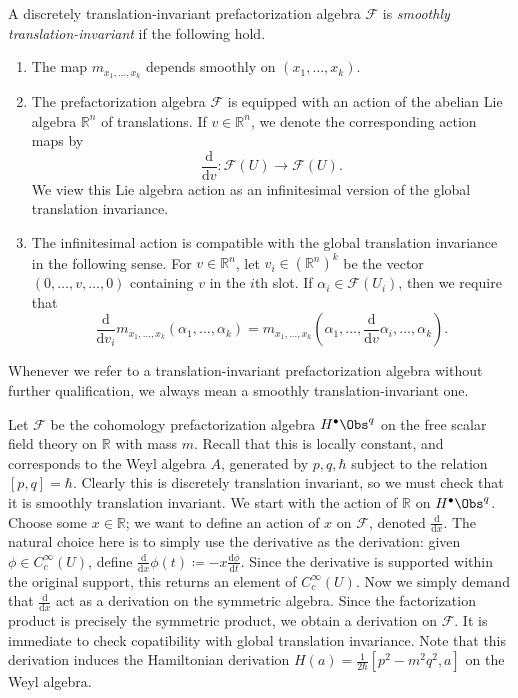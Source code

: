 \begin{definition}\label{dfn:4-8-4}
	A discretely translation-invariant prefactorization algebra $\mathcal{F} $ is \emph{smoothly translation-invariant} if the following hold.
	\begin{enumerate}
		\item The map $m_{x_1, \ldots ,x_k} $ depends smoothly on $(x_1, \ldots ,x_k)$.
		\item The prefactorization algebra $\mathcal{F} $ is equipped with an action of the abelian Lie algebra $\mathbb{R} ^n$ of translations. If $v\in\mathbb{R} ^n$, we denote the corresponding action maps by
			\[
				\frac{\mathrm{d}}{\mathrm{d}v} : \mathcal{F} (U) \to \mathcal{F} (U)
			.\]
			We view this Lie algebra action as an infinitesimal version of the global translation invariance.
		\item The infinitesimal action is compatible with the global translation invariance in the following sense. For $v\in\mathbb{R} ^n$, let $v_i\in(\mathbb{R} ^n)^k$ be the vector $(0, \ldots ,v, \ldots ,0)$ containing $v$ in the $i$th slot. If $\alpha _i\in \mathcal{F} (U_i)$, then we require that
			\[
				\frac{\mathrm{d}}{\mathrm{d}v_i} m_{x_1, \ldots ,x_k} (\alpha _1, \ldots ,\alpha _k)=m_{x_1, \ldots ,x_k} \left( \alpha _1, \ldots , \frac{\mathrm{d}}{\mathrm{d}v} \alpha _i, \ldots ,\alpha _k \right) 
			.\]
	\end{enumerate}
\end{definition}

Whenever we refer to a translation-invariant prefactorization algebra without further qualification, we always mean a smoothly translation-invariant one.

\begin{example}
	Let $\mathcal{F} $ be the cohomology prefactorization algebra $H^{\bullet} \Obs^{q} $ on the free scalar field theory on $\mathbb{R} $ with mass $m$. Recall that this is locally constant, and corresponds to the Weyl algebra $A$, generated by $p,q,\hbar $ subject to the relation $[p,q]=\hbar $. Clearly this is discretely translation invariant, so we must check that it is smoothly translation invariant. We start with the action of $\mathbb{R} $ on $H^{\bullet} \Obs^{q} $. Choose some $x\in\mathbb{R} $; we want to define an action of $x$ on $\mathcal{F} $, denoted $\frac{\mathrm{d}}{\mathrm{d}x} $. The natural choice here is to simply use the derivative as the derivation: given $\phi \in C^\infty _c(U)$, define $\frac{\mathrm{d}}{\mathrm{d}x} \phi (t) \coloneqq -x \frac{\mathrm{d}\phi}{\mathrm{d}t} $. Since the derivative is supported within the original support, this returns an element of $C^\infty _c(U)$. Now we simply demand that $\frac{\mathrm{d}}{\mathrm{d}x} $ act as a derivation on the symmetric algebra. Since the factorization product is precisely the symmetric product, we obtain a derivation on $\mathcal{F} $. It is immediate to check copatibility with global translation invariance. Note that this derivation induces the Hamiltonian derivation $H(a) = \frac{1}{2\hbar } [p^2-m^2q^2,a]$ on the Weyl algebra.
\end{example}

